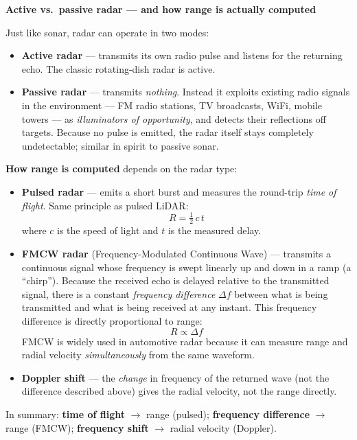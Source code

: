 \documentclass[12pt, a4paper]{article}
\begin{document}
\begin{notebox}
  \textbf{Active vs.\ passive radar --- and how range is actually computed}

  Just like sonar, radar can operate in two modes:
  \begin{itemize}[leftmargin=1.2em,itemsep=3pt]
    \item \textbf{Active radar} --- transmits its own radio pulse and listens
      for the returning echo.  The classic rotating-dish radar is active.
    \item \textbf{Passive radar} --- transmits \emph{nothing}.  Instead it
      exploits existing radio signals in the environment --- FM radio
      stations, TV broadcasts, WiFi, mobile towers --- as
      \textit{illuminators of opportunity}, and detects their reflections
      off targets.  Because no pulse is emitted, the radar itself stays
      completely undetectable; similar in spirit to passive sonar.
  \end{itemize}

  \textbf{How range is computed} depends on the radar type:
  \begin{itemize}[leftmargin=1.2em,itemsep=3pt]
    \item \textbf{Pulsed radar} --- emits a short burst and measures the
      round-trip \emph{time of flight}.  Same principle as pulsed LiDAR:
      \[
        R = \tfrac{1}{2}\,c\,t
      \]
      where $c$ is the speed of light and $t$ is the measured delay.

    \item \textbf{FMCW radar} (Frequency-Modulated Continuous Wave) ---
      transmits a continuous signal whose frequency is swept linearly up and
      down in a ramp (a ``chirp'').  Because the received echo is delayed
      relative to the transmitted signal, there is a constant
      \emph{frequency difference} $\Delta f$ between what is being
      transmitted and what is being received at any instant.  This
      frequency difference is directly proportional to range:
      \[
        R \propto \Delta f
      \]
      FMCW is widely used in automotive radar because it can measure range
      and radial velocity \emph{simultaneously} from the same waveform.

    \item \textbf{Doppler shift} --- the \emph{change} in frequency of the
      returned wave (not the difference described above) gives the radial
      velocity, not the range directly.
  \end{itemize}

  In summary: \textbf{time of flight} $\to$ range (pulsed);
  \textbf{frequency difference} $\to$ range (FMCW);
  \textbf{frequency shift} $\to$ radial velocity (Doppler).
\end{notebox}
\end{document}
